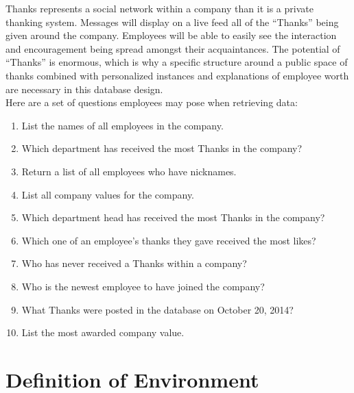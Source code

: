 \documentclass[11pt]{report}
\begin{document}
Thanks represents a social network within a company than it is a private thanking system. Messages will display on a live feed all of the “Thanks” being given around the company. Employees will be able to easily see the interaction and encouragement being spread amongst their acquaintances. The potential of “Thanks” is enormous, which is why a specific structure around a public space of thanks combined with personalized instances and explanations of employee worth are necessary in this database design.\\

\clearpage
Here are a set of questions employees may pose when retrieving data:
\begin{enumerate}
    \item List the names of all employees in the company.
    \item Which department has received the most Thanks in the company?
    \item Return a list of all employees who have nicknames.
    \item List all company values for the company.
    \item Which department head has received the most Thanks in the company?
    \item Which one of an employee's thanks they gave received the most likes?
    \item Who has never received a Thanks within a company?
    \item Who is the newest employee to have joined the company?
    \item What Thanks were posted in the database on October 20, 2014?
    \item List the most awarded company value.
\end{enumerate}

\chapter{Definition of Environment}
\end{document}
